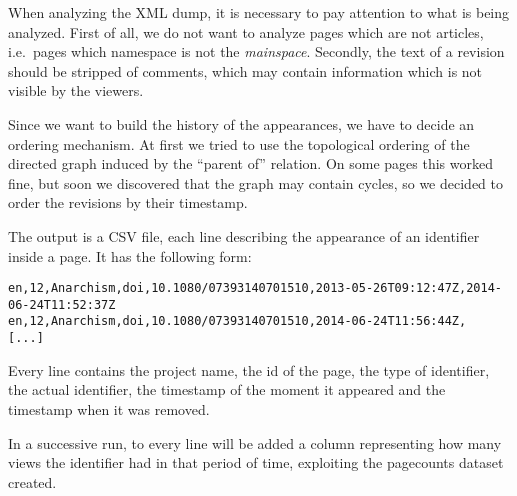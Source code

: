 When analyzing the XML dump, it is necessary to pay attention to what is being analyzed.
First of all, we do not want to analyze pages which are not articles, i.e.\ pages which namespace is not the \emph{mainspace}.
Secondly, the text of a revision should be stripped of comments, which may contain information which is not visible by the viewers.

Since we want to build the history of the appearances, we have to decide an ordering mechanism.
At first we tried to use the topological ordering of the directed graph induced by the ``parent of'' relation.
On some pages this worked fine, but soon we discovered that the graph may contain cycles, so we decided to order the revisions by their timestamp.

The output is a CSV file, each line describing the appearance of an identifier inside a page.
It has the following form:
\begin{verbatim}
en,12,Anarchism,doi,10.1080/07393140701510,2013-05-26T09:12:47Z,2014-06-24T11:52:37Z
en,12,Anarchism,doi,10.1080/07393140701510,2014-06-24T11:56:44Z,
[...]
\end{verbatim}
Every line contains the project name, the id of the page, the type of identifier, the actual identifier, the timestamp of the moment it appeared and the timestamp when it was removed.

In a successive run, to every line will be added a column representing how many views the identifier had in that period of time, exploiting the pagecounts dataset created.
